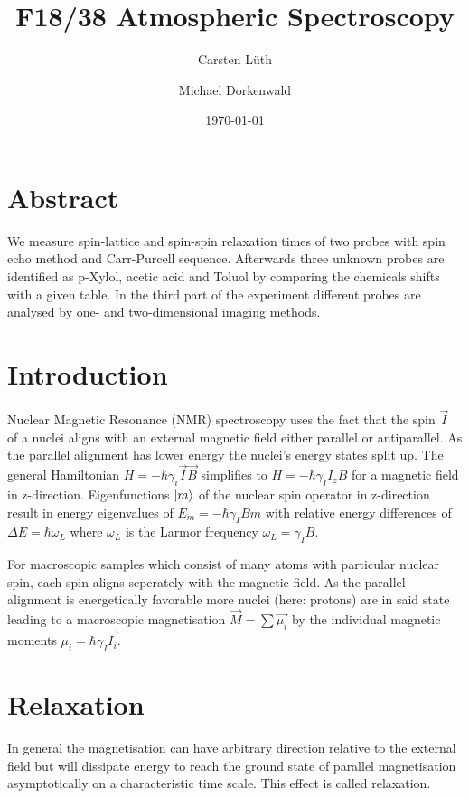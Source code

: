 \documentclass[12pt, english]{scrartcl} %
\title{F18/38 Atmospheric Spectroscopy}
\author{Carsten L{\"u}th \and Michael Dorkenwald}
\date{\today}
\begin{document}
\maketitle

\begin{multicols}{2}


\section{Abstract}
We measure spin-lattice and spin-spin relaxation times of two probes with spin echo method and Carr-Purcell sequence. Afterwards three unknown probes are identified as p-Xylol, acetic acid and Toluol by comparing the chemicals shifts with a given table. In the third part of the experiment different probes are analysed by one- and two-dimensional imaging methods.
\section{Introduction}

Nuclear Magnetic Resonance (NMR) spectroscopy uses the fact that the spin $\vec{I}$ of a nuclei aligns with an external magnetic field either parallel or antiparallel. As the parallel alignment has lower energy the nuclei's energy states split up. The general Hamiltonian $H = -\hbar \gamma_i \vec{I} \vec{B}$ simplifies to $ H = - \hbar \gamma_I I_z B$ for a magnetic field in z-direction. Eigenfunctions $\ket{m}$ of the nuclear spin operator in z-direction result in energy eigenvalues of $E_m = - \hbar \gamma_I B m$ with relative energy differences of $ \Delta E = \hbar \omega_L $ where $\omega_L$ is the Larmor frequency $\omega_L = \gamma_I B$.

For macroscopic samples which consist of many atoms with particular nuclear spin, each spin aligns seperately with the magnetic field. As the parallel alignment is energetically favorable more nuclei (here: protons) are in said state leading to a macroscopic magnetisation $\vec{M} = \sum \vec{\mu_i} $ by the individual magnetic moments $\mu_i = \hbar \gamma_I \vec{I_i}$.


\section{Relaxation}

In general the magnetisation can have arbitrary direction relative to the external field but will dissipate energy to reach the ground state of parallel magnetisation asymptotically on a characteristic time scale. This effect is called relaxation.


\end{multicols}
\end{document}
